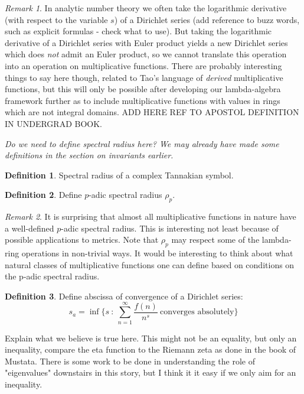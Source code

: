 \documentclass[a4paper]{article}
\theoremstyle{definition}
\newtheorem{definition}{Definition}[section]
\theoremstyle{remark}
\newtheorem*{remark}{Remark}
\begin{document}

\begin{remark}
In analytic number theory we often take the logarithmic derivative (with respect to the variable $s$) of a Dirichlet series (add reference to buzz words, such as explicit formulas - check what to use). But taking the logarithmic derivative of a Dirichlet series with Euler product yields a new Dirichlet series which does \emph{not} admit an Euler product, so we cannot translate this operation into an operation on multiplicative functions. There are probably interesting things to say here though, related to Tao's language of \emph{derived} multiplicative functions, but this will only be possible after developing our lambda-algebra framework further as to include multiplicative functions with values in rings which are not integral domains. ADD HERE REF TO APOSTOL DEFINITION IN UNDERGRAD BOOK.
\end{remark}

\emph{Do we need to define spectral radius here? We may already have made some definitions in the section on invariants earlier.}

\begin{definition}
Spectral radius of a complex Tannakian symbol.
\end{definition}

\begin{definition}
Define $p$-adic spectral radius $\rho_p$.
\end{definition}

\begin{remark}
It is surprising that almost all multiplicative functions in nature have a well-defined $p$-adic spectral radius. This is interesting not least because of possible applications to metrics. Note that $\rho_p$ may respect some of the lambda-ring operations in non-trivial ways. It would be interesting to think about what natural classes of multiplicative functions one can define based on conditions on the p-adic spectral radius.
\end{remark}

\begin{definition}
Define abscissa of convergence of a Dirichlet series:
$$   s_a = \inf \{ s \ : \ \sum_{n=1}^{\infty} \frac{f(n)}{n^s} \ \textrm{converges absolutely}  \}  $$
\end{definition}

Explain what we believe is true here. This might not be an equality, but only an inequality, compare the eta function to the Riemann zeta as done in the book of Mustata. There is some work to be done in understanding the role of "eigenvalues" downstairs in this story, but I think it it easy if we only aim for an inequality.
\end{document}
